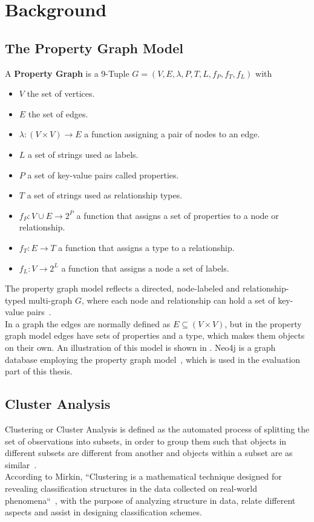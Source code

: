 \chapter{Background}\label{\positionnumber} 

\section{The Property Graph Model}\label{\positionnumber}
A \textbf{Property Graph} is a 9-Tuple $G = (V, E, \lambda, P, T, L, f_P, f_T, f_L)$ with 
\begin{itemize}
    \item $V$ the set of vertices.
    \item $E$ the set of edges.
    \item $\lambda: (V \times V) \rightarrow E$ a function assigning a pair of nodes to an edge.
    \item $L$ a set of strings used as labels.
    \item $P$ a set of key-value pairs called properties.
    \item $T$ a set of strings used as relationship types.
    \item $f_P: V \cup E \rightarrow 2^P$ a function that assigns a set of properties to a node or relationship.
   \item $f_T: E \rightarrow T$ a function that assigns a type to  a relationship.
   \item  $f_L: V \rightarrow 2^L$ a function that assigns a node a set of labels.
\end{itemize} 
\smallskip
The property graph model reflects a directed, node-labeled and relationship-typed multi-graph $G$, where each node and relationship can hold a set of key-value pairs~\cite{angles2018property}. \\
    In a graph the edges are normally defined as $E \subseteq (V \times V)$, but in the property graph model edges have sets of properties and a type, which makes them objects on their own.
    An illustration of this model is shown in .
Neo4j is a graph database employing the property graph model~\cite{neo4j_book}, which is used in the evaluation part of this thesis.


\section{Cluster Analysis}\label{\positionnumber}
Clustering or Cluster Analysis is defined as the automated process of splitting the set of observations into subsets, in order to group them such that objects in different subsets are different from another and objects within a subset are as similar~\cite{han2011data}. \\
According to Mirkin, ``Clustering is a mathematical technique designed for revealing classification structures in the data collected on real-world phenomena``~\cite{mirkin2013mathematical}, with the purpose of analyzing structure in data, relate different aspects and assist in designing classification schemes. \\


